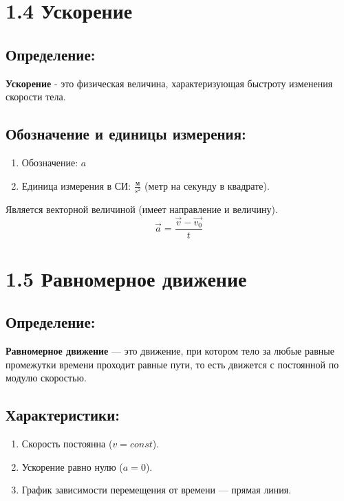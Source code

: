 \documentclass[a4paper,12pt]{article}
\begin{document}
\section*{1.4 Ускорение}
\vspace{-9pt}
\subsection*{Определение:}
\vspace{-3pt}
\textbf{Ускорение} - это физическая величина, характеризующая быстроту изменения скорости тела.
\vspace{-9pt}
\subsection*{Обозначение и единицы измерения:}
\vspace{-3pt}
\begin{enumerate} [itemsep=0pt, topsep=0pt, parsep=3pt]
    \item Обозначение: $a$
    \item Единица измерения в СИ: $\frac{м}{s^2}$ (метр на секунду в квадрате).
\end{enumerate}
Является векторной величиной (имеет направление и величину).
$$ \vec{a} = \frac{\vec{v} - \vec{v_0}}{t} $$


\newpage


\section*{1.5 Равномерное движение}
\vspace{-9pt}
\subsection*{Определение:}
\vspace{-3pt}
\textbf{Равномерное движение} — это движение, при котором тело за любые равные промежутки времени проходит равные пути, то есть движется с постоянной по модулю скоростью.
\vspace{-9pt}
\subsection*{Характеристики:}
\vspace{-3pt}
\begin{enumerate} [itemsep=0pt, topsep=0pt, parsep=3pt]
    \item Скорость постоянна ($v = const$).
    \item Ускорение равно нулю ($a = 0$).
    \item График зависимости перемещения от времени — прямая линия.
\end{enumerate}
\vspace{-9pt}
\end{document}
